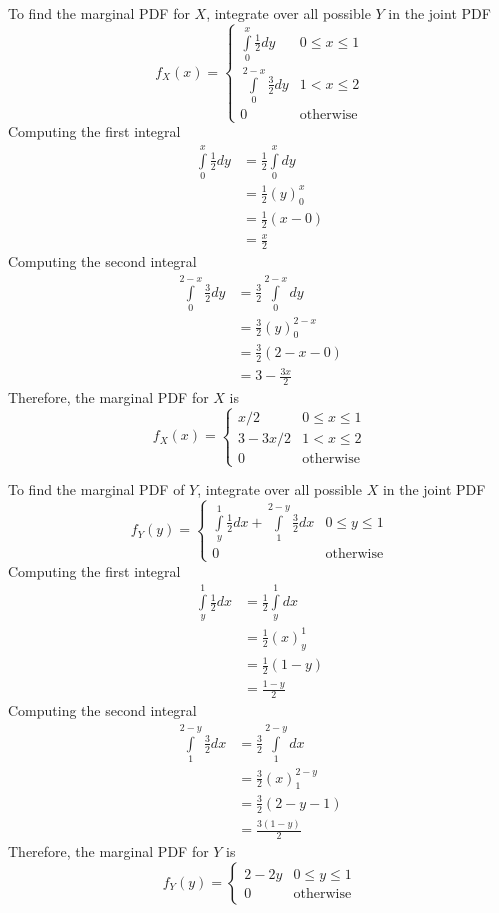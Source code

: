 \documentclass{article}
\begin{document}
To find the marginal PDF for $X$, integrate over all possible $Y$ in the
joint PDF
$$ f_X(x) = \begin{cases}
    \int\limits_0^{x} \frac{1}{2} dy & 0 \leq x \leq 1 \\
    \int\limits_0^{2 - x} \frac{3}{2} dy & 1 < x \leq 2 \\
    0 & \mathrm{otherwise}
\end{cases} $$
Computing the first integral
\begin{align*}
    \int\limits_0^x \frac{1}{2} dy &= \frac{1}{2} \int\limits_0^x dy \\
    &= \frac{1}{2} \left( y \right)_0^x \\
    &= \frac{1}{2} \left( x - 0 \right) \\
    &= \frac{x}{2}
\end{align*}
Computing the second integral
\begin{align*}
    \int\limits_0^{2 - x} \frac{3}{2} dy &= \frac{3}{2} \int\limits_0^{2 - x} dy \\
    &= \frac{3}{2} \left( y \right)_0^{2 - x} \\
    &= \frac{3}{2} \left(2 - x - 0 \right) \\
    &= 3 - \frac{3x}{2}
\end{align*}
Therefore, the marginal PDF for $X$ is
$$ f_X(x) = \begin{cases}
    x / 2 & 0 \leq x \leq 1 \\
    3 - 3x / 2 & 1 < x \leq 2 \\
    0 & \mathrm{otherwise}
\end{cases} $$

To find the marginal PDF of $Y$, integrate over all possible $X$ in the joint
PDF
$$ f_Y(y) = \begin{cases}
    \int\limits_y^1 \frac{1}{2} dx + \int\limits_1^{2 - y} \frac{3}{2} dx & 0 \leq y \leq 1 \\
    0 & \mathrm{otherwise}
\end{cases} $$
Computing the first integral
\begin{align*}
    \int\limits_y^1 \frac{1}{2} dx &= \frac{1}{2} \int\limits_y^1 dx \\
    &= \frac{1}{2} \left( x \right)_y^1 \\
    &= \frac{1}{2} \left( 1 - y \right) \\
    &= \frac{1 - y}{2}
\end{align*}
Computing the second integral
\begin{align*}
    \int\limits_1^{2-y} \frac{3}{2} dx &= \frac{3}{2} \int\limits_1^{2-y} dx \\
    &= \frac{3}{2} \left( x \right)_1^{2-y} \\
    &= \frac{3}{2} \left( 2 - y - 1 \right) \\
    &= \frac{3 (1 - y)}{2}
\end{align*}
Therefore, the marginal PDF for $Y$ is
$$ f_Y(y) = \begin{cases}
    2 - 2y & 0 \leq y \leq 1 \\
    0 & \mathrm{otherwise}
\end{cases} $$
\end{document}
